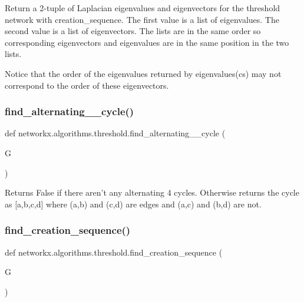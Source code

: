 \begin{DoxyVerb}Return a 2-tuple of Laplacian eigenvalues and eigenvectors
for the threshold network with creation_sequence.
The first value is a list of eigenvalues.
The second value is a list of eigenvectors.
The lists are in the same order so corresponding eigenvectors
and eigenvalues are in the same position in the two lists.

Notice that the order of the eigenvalues returned by eigenvalues(cs)
may not correspond to the order of these eigenvectors.
\end{DoxyVerb}
 \mbox{\label{namespacenetworkx_1_1algorithms_1_1threshold_a5a24579c8037720c0b9d0c88e9663e9c}} 
\subsubsection{\texorpdfstring{find\+\_\+alternating\+\_\+\_\+cycle()}{find\_alternating\_4\_cycle()}}
{\footnotesize\ttfamily def networkx.\+algorithms.\+threshold.\+find\+\_\+alternating\+\_\+\_\+cycle (\begin{DoxyParamCaption}\item[{}]{G }\end{DoxyParamCaption})}

\begin{DoxyVerb}Returns False if there aren't any alternating 4 cycles.
Otherwise returns the cycle as [a,b,c,d] where (a,b)
and (c,d) are edges and (a,c) and (b,d) are not.
\end{DoxyVerb}
 \mbox{\label{namespacenetworkx_1_1algorithms_1_1threshold_a6237b5b78122e1ffafc1a79588602939}} 
\subsubsection{\texorpdfstring{find\+\_\+creation\+\_\+sequence()}{find\_creation\_sequence()}}
{\footnotesize\ttfamily def networkx.\+algorithms.\+threshold.\+find\+\_\+creation\+\_\+sequence (\begin{DoxyParamCaption}\item[{}]{G }\end{DoxyParamCaption})}

